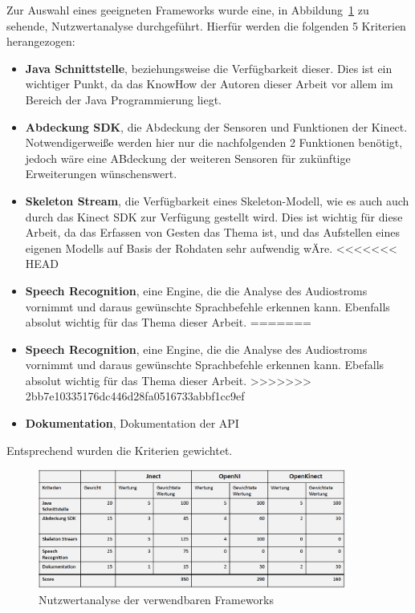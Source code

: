 Zur Auswahl eines geeigneten Frameworks wurde eine, in Abbildung~\ref{fig:nutzwert} zu sehende, Nutzwertanalyse durchgef\"uhrt. 
Hierf\"ur werden die folgenden 5 Kriterien herangezogen:
\begin{itemize}
  \item \textbf{Java Schnittstelle}, beziehungsweise die Verf\"ugbarkeit dieser. Dies ist ein wichtiger Punkt, da das KnowHow der Autoren dieser Arbeit vor allem im Bereich der Java Programmierung liegt.
  \item \textbf{Abdeckung SDK}, die Abdeckung der Sensoren und Funktionen der Kinect. Notwendigerwei\ss e werden hier nur die nachfolgenden 2 Funktionen ben\"otigt, jedoch w\"are eine ABdeckung der weiteren Sensoren f\"ur zuk\"unftige Erweiterungen w\"unschenswert.
  \item \textbf{Skeleton Stream}, die Verf\"ugbarkeit eines Skeleton-Modell, wie es auch auch durch das Kinect SDK zur Verf\"ugung gestellt wird. Dies ist wichtig f\"ur diese Arbeit, da das Erfassen von Gesten das Thema ist, und das Aufstellen eines eigenen Modells auf Basis der Rohdaten sehr aufwendig w\"Are.
<<<<<<< HEAD
  \item \textbf{Speech Recognition}, eine Engine, die die Analyse des Audiostroms vornimmt und daraus gew\"unschte Sprachbefehle erkennen kann. Ebenfalls absolut wichtig f\"ur das Thema dieser Arbeit.
=======
  \item \textbf{Speech Recognition}, eine Engine, die die Analyse des Audiostroms vornimmt und daraus gew\"unschte Sprachbefehle erkennen kann. Ebefalls absolut wichtig f\"ur das Thema dieser Arbeit.
>>>>>>> 2bb7e10335176dc446d28fa0516733abbf1cc9ef
  \item \textbf{Dokumentation}, Dokumentation der API
\end{itemize}
Entsprechend wurden die Kriterien gewichtet.
\begin{figure}[htb]
\centering
\includegraphics[width=0.9\textwidth]{img/04kapitel/nutzwert.png}
\caption[Nutzwertanalyse Frameworks]{Nutzwertanalyse der verwendbaren Frameworks}
\label{fig:nutzwert}
\end{figure}

